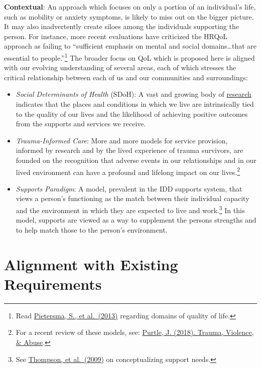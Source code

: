 \documentclass[
]{book}
\providecommand{\tightlist}{%
  \setlength{\itemsep}{0pt}\setlength{\parskip}{0pt}}
\begin{document}
\textbf{Contextual}: An approach which focuses on only a portion of an individual's life, such as mobility or anxiety symptoms, is likely to miss out on the bigger picture. It may also inadvertently create siloes among the individuals supporting the person. For instance, more recent evaluations have criticized the HRQoL approach as failing to ``sufficient emphasis on mental and social domains\ldots{}that are essential to people.''\footnote{Read \href{https://www.ncbi.nlm.nih.gov/pmc/articles/PMC4031380/}{Pietersma, S., et al.~(2013)} regarding domains of quality of life.} The broader focus on QoL which is proposed here is aligned with our evolving understanding of several areas, each of which stresses the critical relationship between each of us and our communities and surroundings:

\begin{itemize}
\tightlist
\item
  \emph{Social Determinants of Health} (SDoH): A vast and growing body of \href{https://www.cdc.gov/socialdeterminants/research/index.htm}{research} indicates that the places and conditions in which we live are intrinsically tied to the quality of our lives and the likelihood of achieving positive outcomes from the supports and services we receive.
\item
  \emph{Trauma-Informed Care}: More and more models for service provision, informed by research and by the lived experience of trauma survivors, are founded on the recognition that adverse events in our relationships and in our lived environment can have a profound and lifelong impact on our lives.\footnote{For a recent review of these models, see: \href{https://www.ncbi.nlm.nih.gov/pubmed/30079827}{Purtle, J. (2018). Trauma, Violence, \& Abuse}.}
\item
  \emph{Supports Paradigm}: A model, prevalent in the IDD supports system, that views a person's functioning as the match between their individual capacity and the environment in which they are expected to live and work.\footnote{See \href{https://www.ncbi.nlm.nih.gov/pubmed/19368481}{Thompson, et al.~(2009)} on conceptualizing support needs.} In this model, supports are viewed as a way to supplement the persons strengths and to help match those to the person's environment.
\end{itemize}

\hypertarget{alignment-with-existing-requirements}{%
\section{Alignment with Existing Requirements}\label{alignment-with-existing-requirements}}
\end{document}
